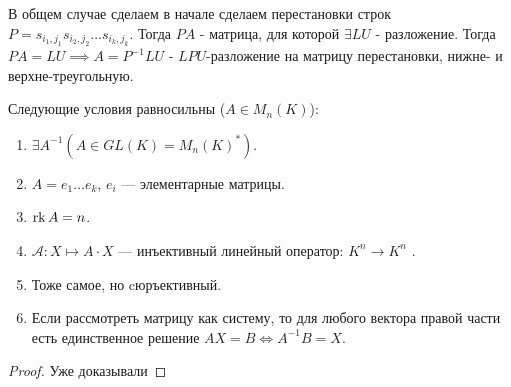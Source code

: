 В общем случае сделаем в начале сделаем перестановки строк $P = s_{i_1,j_1}s_{i_2,j_2}\ldots s_{i_k,j_k}$. Тогда $PA$ - матрица, для которой $\exists LU$ - разложение. Тогда $PA = LU \implies A = P^{-1}LU$ - $LPU$-разложение на матрицу перестановки, нижне- и верхне-треугольную.
\begin{theorem}
    Следующие условия равносильны ($A \in M_n(K)$):
    \begin{enumerate}
        \item $\exists A^{-1} (A \in GL(K) = M_n(K)^*)$.
        \item  $A = e_1 \ldots e_k$, $e_i$ --- элементарные матрицы.
        \item $\operatorname{rk} A = n$.
        \item  $\mathcal{A}\!: X \mapsto A \cdot X$ --- инъективный линейный оператор: $K^n \to K^n$ .
        \item Тоже самое, но cюръективный.
        \item Если рассмотреть матрицу как систему, то для любого вектора правой части есть единственное решение  $AX = B \iff A^{-1}B = X$.
    \end{enumerate}
\end{theorem}
\begin{proof}
    Уже доказывали
\end{proof}